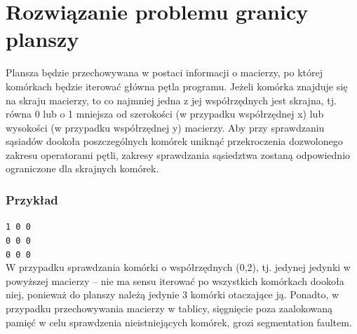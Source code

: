 \documentclass[11pt,a4paper]{report}
\begin{document}
\section {Rozwiązanie problemu granicy planszy}\label{sec:teskt}
Plansza będzie przechowywana w postaci informacji o macierzy, po której komórkach będzie iterować główna pętla programu.
Jeżeli komórka znajduje się na skraju macierzy, to co najmniej jedna z jej współrzędnych jest skrajna, tj. równa 0 lub o 1 mniejsza od szerokości (w przypadku współrzędnej x) lub wysokości (w przypadku współrzędnej y) macierzy.
Aby przy sprawdzaniu sąsiadów dookoła poszczególnych komórek uniknąć przekroczenia dozwolonego zakresu operatorami pętli, zakresy sprawdzania sąsiedztwa zostaną odpowiednio ograniczone dla skrajnych komórek.

\subsubsection{Przykład}
\texttt{1 0 0}\\
\texttt{0 0 0}\\
\texttt{0 0 0}\\
W przypadku sprawdzania komórki o współrzędnych (0,2), tj. jedynej jedynki w powyższej macierzy -- nie ma sensu iterować po wszystkich komórkach dookoła niej, ponieważ do planszy należą jedynie 3 komórki otaczające ją. Ponadto, w przypadku przechowywania macierzy w tablicy, sięgnięcie poza zaalokowaną pamięć w celu sprawdzenia nieistniejących komórek, grozi segmentation faultem.
\end{document}
